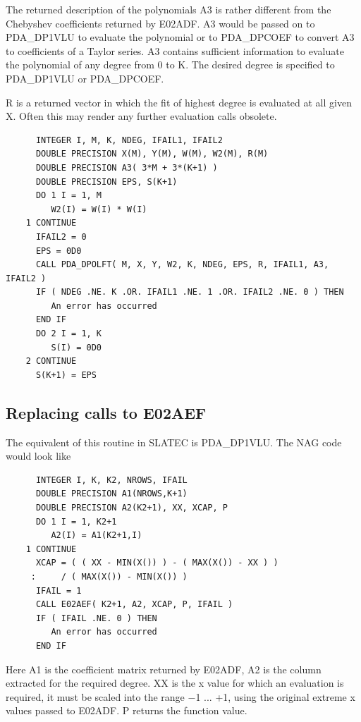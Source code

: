 \documentclass[11pt,twoside]{article}
\newcommand{\htmlref}[2]{#1}
\newcommand{\xlabel}[1]{}
\begin{document}
   The returned description of the polynomials A3 is rather different
   from the Chebyshev coefficients returned by E02ADF. A3 would be
   passed on to
\htmlref{PDA\_DP1VLU}{PDA\_DP1VLU}
   to evaluate the polynomial or to
\htmlref{PDA\_DPCOEF}{PDA\_DPCOEF}
   to
   convert A3 to coefficients of a Taylor series. A3 contains sufficient
   information to evaluate the polynomial of any degree from 0 to K. The
   desired degree is specified to PDA\_DP1VLU or PDA\_DPCOEF.

   R is a returned vector in which the fit of highest degree is
   evaluated at all given X. Often this may render any further
   evaluation calls obsolete.

\begin{verbatim}
      INTEGER I, M, K, NDEG, IFAIL1, IFAIL2
      DOUBLE PRECISION X(M), Y(M), W(M), W2(M), R(M)
      DOUBLE PRECISION A3( 3*M + 3*(K+1) )
      DOUBLE PRECISION EPS, S(K+1)
      DO 1 I = 1, M
         W2(I) = W(I) * W(I)
    1 CONTINUE
      IFAIL2 = 0
      EPS = 0D0
      CALL PDA_DPOLFT( M, X, Y, W2, K, NDEG, EPS, R, IFAIL1, A3, IFAIL2 )
      IF ( NDEG .NE. K .OR. IFAIL1 .NE. 1 .OR. IFAIL2 .NE. 0 ) THEN
         An error has occurred
      END IF
      DO 2 I = 1, K
         S(I) = 0D0
    2 CONTINUE
      S(K+1) = EPS
\end{verbatim}


\subsection{\xlabel{replacing_calls_to_e02aef}\label{m_e02aef}Replacing calls to E02AEF}

   The equivalent of this routine in SLATEC is
\htmlref{PDA\_DP1VLU.}{PDA\_DP1VLU}
   The NAG code
   would look like

\begin{verbatim}
      INTEGER I, K, K2, NROWS, IFAIL
      DOUBLE PRECISION A1(NROWS,K+1)
      DOUBLE PRECISION A2(K2+1), XX, XCAP, P
      DO 1 I = 1, K2+1
         A2(I) = A1(K2+1,I)
    1 CONTINUE
      XCAP = ( ( XX - MIN(X()) ) - ( MAX(X()) - XX ) )
     :     / ( MAX(X()) - MIN(X()) )
      IFAIL = 1
      CALL E02AEF( K2+1, A2, XCAP, P, IFAIL )
      IF ( IFAIL .NE. 0 ) THEN
         An error has occurred
      END IF
\end{verbatim}

   Here A1 is the coefficient matrix returned by
\htmlref{E02ADF,}{m_e02adf}
   A2 is the
   column extracted for the required degree. XX is the x value for
   which an evaluation is required, it must be scaled into the range
   $-$1 ... +1, using the original extreme x values passed to E02ADF. P
   returns the function value.
\end{document}
